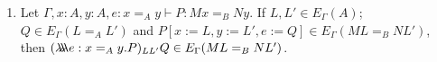 \begin{lemma}
\label{lm:wte}
$ $
\begin{enumerate}
\item
\label{lm:wteE}
Let $\Gamma, x : A, y : A, e : x =_A y \vdash P : M x =_B N y$.  If
$L, L' \in E_\Gamma(A)$; $Q \in E_\Gamma(L =_A L')$ and $P[ x := L, y := L', e
:= Q ] \in E_\Gamma(M L =_B N L')$, then $(\lambda \!\! \lambda \!\! \lambda e : x =_A y . P)_{L L'} Q \in E_\Gamma(ML =_B NL')$.
\begin{code}%
\> \AgdaSymbol{:}  \AgdaSymbol{\{}\AgdaSymbol{\}} \AgdaSymbol{\{} \AgdaSymbol{:}  \AgdaSymbol{\}} \AgdaSymbol{\{}       \AgdaSymbol{\}} \<%
\\
\>[0]\<[2]%
\>[2]       \AgdaSymbol{(}   \AgdaSymbol{)} \AgdaSymbol{(} \AgdaSymbol{)}     \AgdaSymbol{(}   \AgdaSymbol{)} \AgdaSymbol{(} \AgdaSymbol{)}  \<[77]%
\>[77]\<%
\\
\>[0]\<[2]%
\>[2]  \AgdaSymbol{(} \AgdaSymbol{)}     \AgdaSymbol{(} \AgdaSymbol{)}     \AgdaSymbol{(}    \AgdaSymbol{)}  \<%
\\
\>[0]\<[2]%
\>[2]  \AgdaSymbol{(}        \AgdaSymbol{)} \AgdaSymbol{(}        \AgdaSymbol{)} \<%
\\
\>[0]\<[2]%
\>[2]  \AgdaSymbol{(}        \AgdaSymbol{)} \AgdaSymbol{(}   \AgdaSymbol{(}  \AgdaSymbol{)} \AgdaSymbol{)}\<%
\end{code}


\end{enumerate}
\end{lemma}
